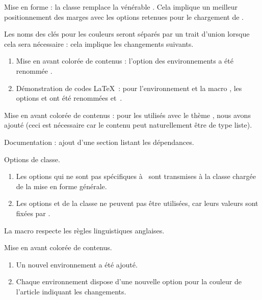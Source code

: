 \documentclass{tutodoc}
\begin{document}
\begin{tdocbreak}
	\item Mise en forme : la classe  remplace la vénérable . Cela implique un meilleur positionnement des marges avec les options retenues pour le chargement de .


	\item Les noms des clés pour les couleurs seront séparés par un trait d'union lorsque cela sera nécessaire : cela implique les changements suivants.
	\begin{enumerate}
		\item Mise en avant colorée de contenus : l'option  des environnements a été renommée .

		\item Démonstration de codes \LaTeX\ : pour l'environnement  et la macro , les options  et  ont été renommées  et \,.
	\end{enumerate}
\end{tdocbreak}


\begin{tdocfix}
	\item Mise en avant colorée de contenus : pour les  utilisés avec le thème , nous avons ajouté  (ceci est nécessaire car le contenu peut naturellement être de type liste).
\end{tdocfix}


\begin{tdocnew}
	\item Documentation : ajout d'une section listant les dépendances.

	\item Options de classe.
	\begin{enumerate}
		\item Les options qui ne sont pas spécifiques à \thisproj\ sont transmises à la classe chargée de la mise en forme générale.

		\item Les options  et  de la classe  ne peuvent pas être utilisées, car leurs valeurs sont fixées par \thisproj.
	\end{enumerate}

	\item La macro  respecte les règles linguistiques anglaises.

	\item Mise en avant colorée de contenus.
	\begin{enumerate}
		\item Un nouvel environnement  a été ajouté.

		\item Chaque environnement dispose d'une nouvelle option  pour la couleur de l'article indiquant les changements.
	\end{enumerate}
\end{tdocnew}
\end{document}
